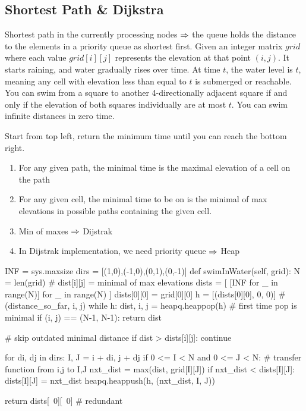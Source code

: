 \subsection{Shortest Path \& Dijkstra}
 Shortest path in the currently processing nodes $\Rightarrow$ the queue holds the distance to the elements in a priority queue as shortest first. 
 Given an integer matrix $grid$ where each value $grid[i][j]$ represents the elevation at that point $(i, j)$. It starts raining, and water gradually rises over time. At time $t$, the water level is $t$, meaning any cell with elevation less than equal to $t$ is submerged or reachable. You can swim from a square to another 4-directionally adjacent square if and only if the elevation of both squares individually are at most $t$. You can swim infinite distances in zero time.

Start from top left, return the minimum time until you can reach the bottom right.

\begin{enumerate}
\item For any given path, the minimal time is the maximal elevation of a cell on the path
\item For any given cell, the minimal time to be on is the minimal of max elevations in possible paths containing the given cell. 
\item Min of maxes $\Rightarrow$ Dijstrak
\item In Dijstrak implementation, we need priority queue $\Rightarrow$ Heap
\end{enumerate}
\begin{python}
INF = sys.maxsize
dirs = [(1,0),(-1,0),(0,1),(0,-1)]
def swimInWater(self, grid):
  N = len(grid)
  # dist[i][j] = minimal of max elevations
  dists = [
    [INF for _ in range(N)] 
    for _ in range(N)
  ]
  dists[0][0] = grid[0][0]
  h = [(dists[0][0], 0, 0)]  # (distance_so_far, i, j)
  while h:
    dist, i, j = heapq.heappop(h)
    # first time pop is minimal
    if (i, j) == (N-1, N-1):
      return dist
    
    # skip outdated minimal distance
    if dist > dists[i][j]:
      continue

    for di, dj in dirs:
      I, J = i + di, j + dj
      if 0 <= I < N and 0 <= J < N:
        # transfer function from i,j to I,J
        nxt_dist = max(dist, grid[I][J])
        if nxt_dist < dists[I][J]:
          dists[I][J] = nxt_dist
          heapq.heappush(h, (nxt_dist, I, J))

  return dists[~0][~0] # redundant
\end{python}

